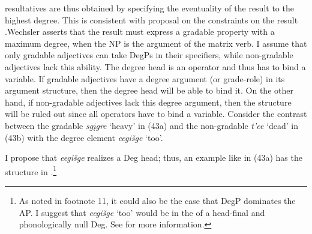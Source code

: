 \documentclass[output=paper]{LSP/langsci}
\begin{document}
 resultatives are thus obtained by specifying the eventuality of the result to the highest degree. This is consistent with  proposal on the constraints on the result .Wechsler asserts that the result must express a gradable property with a maximum degree, when the  NP is the argument of the matrix verb. I assume that only gradable adjectives can take DegPs in their specifiers, while non-gradable adjectives lack this ability. The degree head is an operator and thus has to bind a variable. If gradable adjectives have a degree argument (or grade-role) in its argument structure, then the degree head will be able to bind it. On the other hand, if non-gradable adjectives lack this degree argument, then the structure will be ruled out since all operators have to bind a variable. Consider the contrast between the gradable  \textit{sgįgre} `heavy' in (43a) and the non-gradable  \textit{t'ee} `dead' in (43b) with the degree element \textit{eegišge} `too'.

\begin{exe}
\ex\label{ex:rosen:43}
\begin{xlist}




\end{xlist}
\end{exe}

I propose that \textit{eegišge} realizes a Deg head; thus, an example like in (43a) has the structure in .\footnote{As noted in footnote 11, it could also be the case that DegP dominates the AP. I suggest that \textit{eegišge} `too' would be in the  of a head-final and phonologically null Deg. See \citet{Rosen2015} for more information.}

\begin{exe}
\ex \label{ex:rosen:44}
{\hspace{1em}}\newline
{}
\end{exe}
\end{document}
